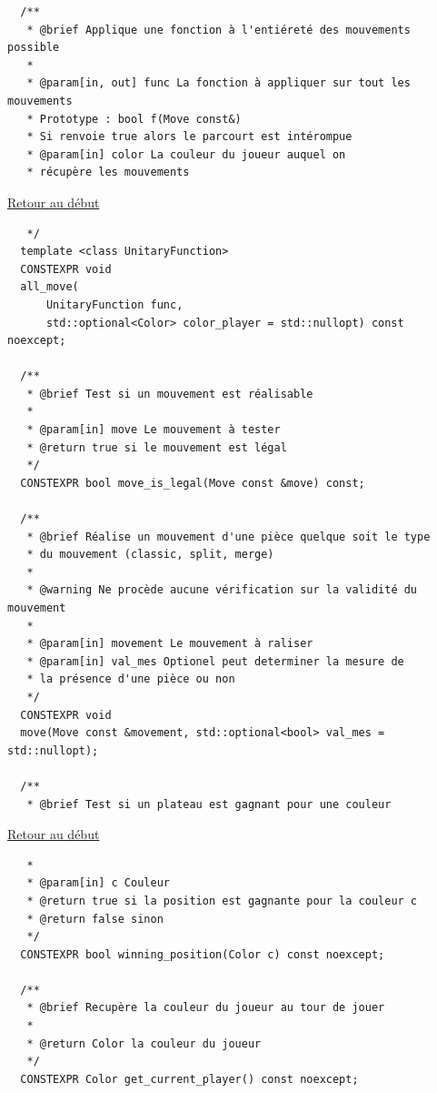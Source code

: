 {\begin{frame}[fragile]
\begin{verbatim}
  /**
   * @brief Applique une fonction à l'entiéreté des mouvements possible
   *
   * @param[in, out] func La fonction à appliquer sur tout les mouvements
   * Prototype : bool f(Move const&)
   * Si renvoie true alors le parcourt est intérompue
   * @param[in] color La couleur du joueur auquel on
   * récupère les mouvements
\end{verbatim}
\end{frame}

\begin{frame}[fragile]
\hyperlink{conclusion}{Retour au début}\newline
\begin{verbatim}
   */
  template <class UnitaryFunction>
  CONSTEXPR void
  all_move(
      UnitaryFunction func,
      std::optional<Color> color_player = std::nullopt) const noexcept;

  /**
   * @brief Test si un mouvement est réalisable
   *
   * @param[in] move Le mouvement à tester
   * @return true si le mouvement est légal
   */
  CONSTEXPR bool move_is_legal(Move const &move) const;

  /**
   * @brief Réalise un mouvement d'une pièce quelque soit le type
   * du mouvement (classic, split, merge)
   *
   * @warning Ne procède aucune vérification sur la validité du mouvement
   *
   * @param[in] movement Le mouvement à raliser
   * @param[in] val_mes Optionel peut determiner la mesure de
   * la présence d'une pièce ou non
   */
  CONSTEXPR void
  move(Move const &movement, std::optional<bool> val_mes = std::nullopt);

  /**
   * @brief Test si un plateau est gagnant pour une couleur
\end{verbatim}
\end{frame}

\begin{frame}[fragile]
\hyperlink{conclusion}{Retour au début}\newline
\begin{verbatim}
   *
   * @param[in] c Couleur
   * @return true si la position est gagnante pour la couleur c
   * @return false sinon
   */
  CONSTEXPR bool winning_position(Color c) const noexcept;

  /**
   * @brief Recupère la couleur du joueur au tour de jouer
   *
   * @return Color la couleur du joueur
   */
  CONSTEXPR Color get_current_player() const noexcept;


\end{verbatim}
\end{frame}}
